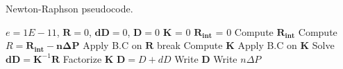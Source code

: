 \documentclass{article}
\begin{document}
\begin{algorithm}[ht]
\caption{Newton-Raphson pseudocode.}
\begin{algorithmic} 
\ENSURE $e = 1E-11$, $\boldsymbol{R} = 0$, $\boldsymbol{dD} = 0$,  $\boldsymbol{D} = 0$
        \STATE $\boldsymbol{K}$ = 0
        \STATE $\boldsymbol{R_{int}}$ = 0
        \STATE Compute $\boldsymbol{R_{int}}$
        \STATE Compute $R = \boldsymbol{R_{int} - n \Delta P}$
        \STATE Apply B.C on $\boldsymbol{R}$
            \STATE break
        \ENDIF
        \STATE Compute $\boldsymbol{K}$
        \STATE Apply B.C on $\boldsymbol{K}$
        \STATE Solve $\boldsymbol{dD} = \boldsymbol{K}^{-1} \boldsymbol{R}$
        \STATE Factorize $\boldsymbol{K}$
        \STATE $\boldsymbol{D} = D + dD$
    \ENDFOR
    \STATE Write $\boldsymbol{D}$
    \STATE Write $n \Delta P$
\ENDFOR
\end{algorithmic}
\label{alg:nr}
\end{algorithm}
\end{document}
